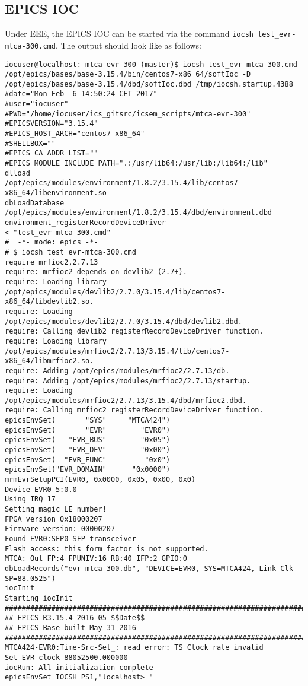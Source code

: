 \documentclass[11pt
  , a4paper
  , article
  , oneside
  , showtrims
]{memoir}
\begin{document}
\subsection{EPICS IOC}
Under EEE, the EPICS IOC can be started via the command \texttt{iocsh test\_evr-mtca-300.cmd}. The output should look like as follows:

\begin{lstlisting}[style=termstyle]
iocuser@localhost: mtca-evr-300 (master)$ iocsh test_evr-mtca-300.cmd
/opt/epics/bases/base-3.15.4/bin/centos7-x86_64/softIoc -D /opt/epics/bases/base-3.15.4/dbd/softIoc.dbd /tmp/iocsh.startup.4388
#date="Mon Feb  6 14:50:24 CET 2017"
#user="iocuser"
#PWD="/home/iocuser/ics_gitsrc/icsem_scripts/mtca-evr-300"
#EPICSVERSION="3.15.4"
#EPICS_HOST_ARCH="centos7-x86_64"
#SHELLBOX=""
#EPICS_CA_ADDR_LIST=""
#EPICS_MODULE_INCLUDE_PATH=".:/usr/lib64:/usr/lib:/lib64:/lib"
dlload         /opt/epics/modules/environment/1.8.2/3.15.4/lib/centos7-x86_64/libenvironment.so
dbLoadDatabase /opt/epics/modules/environment/1.8.2/3.15.4/dbd/environment.dbd
environment_registerRecordDeviceDriver
< "test_evr-mtca-300.cmd"
#  -*- mode: epics -*-
# $ iocsh test_evr-mtca-300.cmd
require mrfioc2,2.7.13
require: mrfioc2 depends on devlib2 (2.7+).
require: Loading library /opt/epics/modules/devlib2/2.7.0/3.15.4/lib/centos7-x86_64/libdevlib2.so.
require: Loading /opt/epics/modules/devlib2/2.7.0/3.15.4/dbd/devlib2.dbd.
require: Calling devlib2_registerRecordDeviceDriver function.
require: Loading library /opt/epics/modules/mrfioc2/2.7.13/3.15.4/lib/centos7-x86_64/libmrfioc2.so.
require: Adding /opt/epics/modules/mrfioc2/2.7.13/db.
require: Adding /opt/epics/modules/mrfioc2/2.7.13/startup.
require: Loading /opt/epics/modules/mrfioc2/2.7.13/3.15.4/dbd/mrfioc2.dbd.
require: Calling mrfioc2_registerRecordDeviceDriver function.
epicsEnvSet(       "SYS"     "MTCA424")
epicsEnvSet(       "EVR"        "EVR0")
epicsEnvSet(   "EVR_BUS"        "0x05")
epicsEnvSet(   "EVR_DEV"        "0x00")
epicsEnvSet(  "EVR_FUNC"         "0x0")
epicsEnvSet("EVR_DOMAIN"      "0x0000")
mrmEvrSetupPCI(EVR0, 0x0000, 0x05, 0x00, 0x0)
Device EVR0 5:0.0
Using IRQ 17
Setting magic LE number!
FPGA version 0x18000207
Firmware version: 00000207
Found EVR0:SFP0 SFP transceiver
Flash access: this form factor is not supported.
MTCA: Out FP:4 FPUNIV:16 RB:40 IFP:2 GPIO:0
dbLoadRecords("evr-mtca-300.db", "DEVICE=EVR0, SYS=MTCA424, Link-Clk-SP=88.0525")
iocInit
Starting iocInit
############################################################################
## EPICS R3.15.4-2016-05 $$Date$$
## EPICS Base built May 31 2016
############################################################################
MTCA424-EVR0:Time-Src-Sel_: read error: TS Clock rate invalid
Set EVR clock 88052500.000000
iocRun: All initialization complete
epicsEnvSet IOCSH_PS1,"localhost> "
\end{lstlisting}
\end{document}
